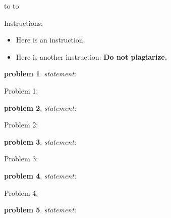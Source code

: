 \documentclass[10pt]{article}
\newcommand{\handout}{
   \renewcommand{\thepage}{\hnumber-\arabic{page}}
   \noindent
   \begin{center}
    \vbox{
        \hbox to \columnwidth {\sc{\course} --- \prof \hfill}
        \hbox to \columnwidth {\sc due \MakeLowercase{\duedate\ \duelocation} 
        \hfill {}}
        \vspace{2mm}
        \vfill {\Huge\color{mdb}\hnumber \ \yourname}
        }
   \end{center}
   \vspace*{2mm}
}
\newtheorem{problem}{\sc\color{cit}problem}
\begin{document}
\handout
Instructions:
\begin{itemize}
    \item {Here is an instruction.}
    \item {Here is another instruction: \textbf{Do not plagiarize.}}
\end{itemize}
\newpage


\begin{problem} statement:

\end{problem}

\begin{solution} Problem 1:

\end{solution}
\vspace{2cm}



\begin{problem} statement:

\end{problem}

\begin{solution} Problem 2:

\end{solution}
\vspace{2cm}



\begin{problem} statement:

\end{problem}

\begin{solution} Problem 3:

\end{solution}
\vspace{2cm}



\begin{problem} statement:
    
\end{problem}

\begin{solution} Problem 4:

\end{solution}
\vspace{2cm}



\begin{problem} statement:

\end{problem}
\end{document}
